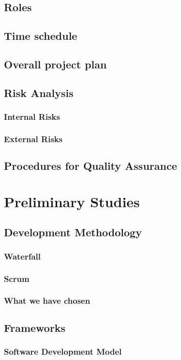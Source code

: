 \documentclass[12pt, a4paper]{article}
\begin{document}
\subsection{Roles}
\subsection{Time schedule}
\subsection{Overall project plan}
\subsection{Risk Analysis}
\subsubsection{Internal Risks}
\subsubsection{External Risks}
\subsection{Procedures for Quality Assurance}

\section{Preliminary Studies}
\subsection{Development Methodology}
\subsubsection{Waterfall}
\subsubsection{Scrum}
\subsubsection{What we have chosen}
\subsection{Frameworks}
\subsubsection{Software Development Model}
\end{document}
